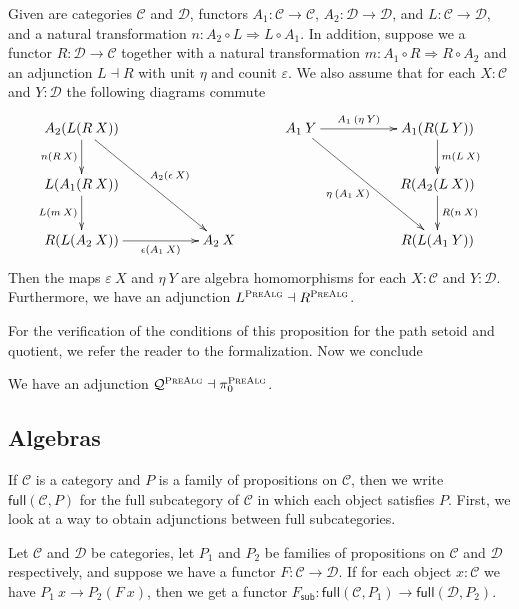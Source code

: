 \documentclass[9pt]{entcs}
\newcommand{\category}[1]{\textsc{#1}}
\newcommand{\function}[1]{\mathsf{#1}}
\newcommand{\0}{\textbf{0}} %
\newcommand{\functor}[2]{#1 \longrightarrow #2} %
\newcommand{\compf}[2]{#2 \circ #1} %
\newcommand{\nattrans}[2]{#1 \Longrightarrow #2} %
\newcommand{\adj}[2]{#1 \dashv #2} %
\newcommand{\fullsub}[2]{\function{full}(#1,#2)} %
\newcommand{\factorsub}[1]{#1_{\function{sub}}} %
\newcommand{\quotPA}{\mathcal{Q}^{\category{PreAlg}}}
\newcommand{\pathPA}{\pi^{\category{PreAlg}}_0}
\begin{document}
\begin{proposition}
\label{lem:prealgadjconstr}
Given are categories $\mathcal{C}$ and $\mathcal{D}$, functors $A_1 : \functor{\mathcal{C}}{\mathcal{C}}$, $A_2 : \functor{\mathcal{D}}{\mathcal{D}}$, and $L : \functor{\mathcal{C}}{\mathcal{D}}$, and a natural transformation $n : \nattrans{\compf{L}{A_2}}{\compf{A_1}{L}}$.
In addition, suppose we a functor $R : \functor{\mathcal{D}}{\mathcal{C}}$ together with a natural transformation $m : \nattrans{\compf{R}{A_1}}{\compf{A_2}{R}}$ and an adjunction $\adj{L}{R}$ with unit $\eta$ and counit $\varepsilon$.
We also assume that for each $X : \mathcal{C}$ and $Y : \mathcal{D}$ the following diagrams commute
\[
\xymatrix
{	
	A_2 (L(R \> X)) \ar[ddrr]^{A_2(\epsilon \> X)} \ar[d]_{n(R \> X)} \\
	L(A_1(R \> X)) \ar[d]_{L(m \> X)} \\
	R(L(A_2 \> X)) \ar[rr]_-{\epsilon(A_1 \> X)} & & A_2 \> X
}
\quad \quad \quad
\xymatrix
{
	A_1 \> Y \ar[ddrr]_{\eta \> (A_1 \> X)} \ar[rr]^-{A_1 \> (\eta \> Y)} & & A_1(R(L \> Y)) \ar[d]^{m(L \> X)}\\
	& & R(A_2(L \> X)) \ar[d]^{R(n \> X)}\\
	& & R(L(A_1 \> Y))
}
\]
Then the maps $\varepsilon \> X$ and $\eta \> Y$ are algebra homomorphisms for each $X : \mathcal{C}$ and $Y : \mathcal{D}$.
Furthermore, we have an adjunction $\adj{L^{\category{PreAlg}}}{R^{\category{PreAlg}}}$.
\end{proposition}

For the verification of the conditions of this proposition for the path setoid and quotient, we refer the reader to the formalization.
Now we conclude

\begin{lemma}
\label{lem:adjprealg}
We have an adjunction $\adj{\quotPA}{\pathPA}$.
\end{lemma}

\subsection{Algebras}

If $\mathcal{C}$ is a category and $P$ is a family of propositions on $\mathcal{C}$, then we write $\fullsub{\mathcal{C}}{P}$ for the full subcategory of $\mathcal{C}$ in which each object satisfies $P$.
First, we look at a way to obtain adjunctions between full subcategories.

\begin{lemma}
Let $\mathcal{C}$ and $\mathcal{D}$ be categories, let $P_1$ and $P_2$ be families of propositions on $\mathcal{C}$ and $\mathcal{D}$ respectively, and suppose we have a functor $F : \functor{\mathcal{C}}{\mathcal{D}}$.
If for each object $x : \mathcal{C}$ we have $P_1 \> x \rightarrow P_2(F \> x)$, then we get a functor $\factorsub{F} : \functor{\fullsub{\mathcal{C}}{P_1}}{\fullsub{\mathcal{D}}{P_2}}$.
\end{lemma}
\end{document}
